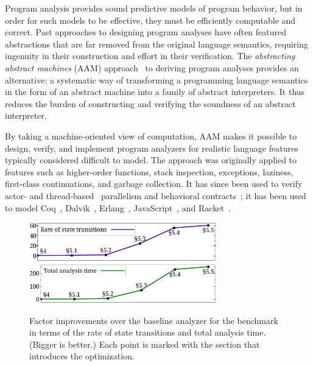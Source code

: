 \documentclass[9pt]{sigplanconf} %
\begin{document}
Program analysis provides sound predictive models of program behavior, but in order for such models to be effective, they must be efficiently computable and correct.
%
Past approaches to designing program analyses have often featured abstractions that are far removed from the original language semantics, requiring ingenuity in their construction and effort in their verification.
%
The \emph{abstracting abstract machines} (AAM) approach~\cite{dvanhorn:VanHorn2011Abstracting,dvanhorn:VanHorn2012Systematic} to deriving program analyses provides an alternative: a systematic way of transforming a programming language semantics in the form of an abstract machine into a family of abstract interpreters.
%
It thus reduces the burden of constructing and verifying the soundness of an abstract interpreter.
%

%

By taking a machine-oriented view of computation, AAM makes it possible to design, verify, and implement program analyzers for realistic language features typically considered difficult to model.
%
The approach was originally applied to features such as higher-order functions, stack inspection, exceptions, laziness, first-class continuations, and garbage collection.
%
It has since been used to verify actor-\cite{local:DOsualdo:12A} and thread-based~\cite{dvanhorn:Might2011Family} parallelism and behavioral contracts~\cite{dvanhorn:TobinHochstadt2012Higherorder};
%
it has been used to model Coq~\cite{local:harvard}, Dalvik~\cite{local:dalvik}, Erlang~\cite{local:DOsualdo:12B}, JavaScript~\cite{local:DBLP:journals/corr/abs-1109-4467}, and Racket~\cite{dvanhorn:TobinHochstadt2012Higherorder}.

\begin{figure}[t]
\small
\begin{center}
\includegraphics[width=3.2in]{church-relative-speed}
\includegraphics[width=3.2in]{church-relative-time}
\vspace{-1.5em}
\end{center}
\caption{
Factor improvements over the baseline analyzer for the \Church{} benchmark in terms of the rate of state transitions and total analysis time.
%
(Bigger is better.)
%
Each point is marked with the section that introduces the optimization.}
\label{fig:churchtime}
\end{figure}
\end{document}
